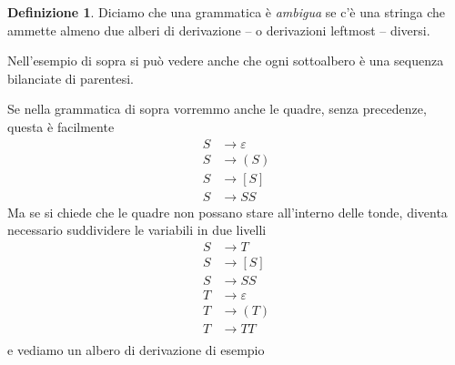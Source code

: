 \documentclass[12pt]{report}
\theoremstyle{definition}
\newtheorem{definizione}{Definizione}
\theoremstyle{regard}
\begin{document}
\begin{definizione}
Diciamo che una grammatica è \textit{ambigua} se c'è una stringa che ammette almeno due alberi di derivazione -- o derivazioni leftmost -- diversi.
\end{definizione}

Nell'esempio di sopra si può vedere anche che ogni sottoalbero è una sequenza bilanciate di parentesi.

\begin{tcolorbox} %
Se nella grammatica di sopra vorremmo anche le quadre, senza precedenze, questa è facilmente
\begin{align*}
 	S &\rightarrow \varepsilon \\
 	S &\rightarrow ( S ) \\
 	S &\rightarrow [ S ] \\
 	S &\rightarrow S S
\end{align*}
Ma se si chiede che le quadre non possano stare all'interno delle tonde, diventa necessario suddividere le variabili in due livelli
\begin{align*}
 	S &\rightarrow T \\
 	S &\rightarrow [ S ] \\
 	S &\rightarrow S S \\
 	T &\rightarrow \varepsilon \\
 	T &\rightarrow ( T ) \\
 	T &\rightarrow T T \\
\end{align*}
e vediamo un albero di derivazione di esempio
\begin{center}
\end{center}
\end{tcolorbox}
\end{document}
